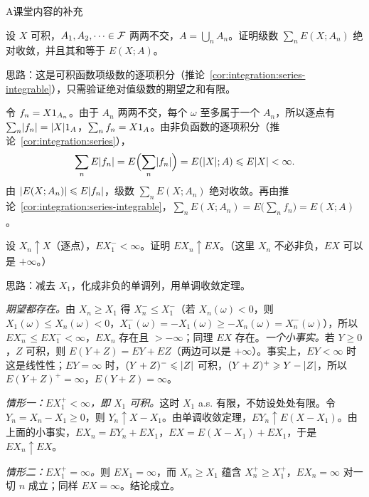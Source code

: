 \begin{exercises}{A}{课堂内容的补充}
\item\label{ex:expectation:A1} 设 $X$ 可积，$A_1,A_2,\dots\in\mathcal{F}$ 两两不交，$A=\bigcup_nA_n$。证明级数 $\sum_nE(X;A_n)$ 绝对收敛，并且其和等于 $E(X;A)$。
\begin{solution}
思路：这是可积函数项级数的逐项积分（推论~\ref{cor:integration:series-integrable}），只需验证绝对值级数的期望之和有限。

令 $f_n=X1_{A_n}$。由于 $A_n$ 两两不交，每个 $\omega$ 至多属于一个 $A_n$，所以逐点有 $\sum_n\lvert f_n\rvert=\lvert X\rvert1_A$，$\sum_nf_n=X1_A$。由非负函数的逐项积分（推论~\ref{cor:integration:series}），
\[
\sum_nE\lvert f_n\rvert=E\Bigl(\sum_n\lvert f_n\rvert\Bigr)=E(\lvert X\rvert;A)\leqslant E\lvert X\rvert<\infty .
\]
由 $\lvert E(X;A_n)\rvert\leqslant E\lvert f_n\rvert$，级数 $\sum_nE(X;A_n)$ 绝对收敛。再由推论~\ref{cor:integration:series-integrable}，$\sum_nE(X;A_n)=E\bigl(\sum_nf_n\bigr)=E(X;A)$。
\end{solution}

\item\label{ex:expectation:A2} 设 $X_n\uparrow X$（逐点），$EX_1^-<\infty$。证明 $EX_n\uparrow EX$。（这里 $X_n$ 不必非负，$EX$ 可以是 $+\infty$。）
\begin{solution}
思路：减去 $X_1$，化成非负的单调列，用单调收敛定理。

\emph{期望都存在。}由 $X_n\geqslant X_1$ 得 $X_n^-\leqslant X_1^-$（若 $X_n(\omega)<0$，则 $X_1(\omega)\leqslant X_n(\omega)<0$，$X_1^-(\omega)=-X_1(\omega)\geqslant-X_n(\omega)=X_n^-(\omega)$），所以 $EX_n^-\leqslant EX_1^-<\infty$，$EX_n$ 存在且 $>-\infty$；同理 $EX$ 存在。\emph{一个小事实。}若 $Y\geqslant0$，$Z$ 可积，则 $E(Y+Z)=EY+EZ$（两边可以是 $+\infty$）。事实上，$EY<\infty$ 时这是线性性；$EY=\infty$ 时，$(Y+Z)^-\leqslant\lvert Z\rvert$ 可积，$(Y+Z)^+\geqslant Y-\lvert Z\rvert$，所以 $E(Y+Z)^+=\infty$，$E(Y+Z)=\infty$。

\emph{情形一：$EX_1^+<\infty$，即 $X_1$ 可积。}这时 $X_1$ a.s. 有限，不妨设处处有限。令 $Y_n=X_n-X_1\geqslant0$，则 $Y_n\uparrow X-X_1$。由单调收敛定理，$EY_n\uparrow E(X-X_1)$。由上面的小事实，$EX_n=EY_n+EX_1$，$EX=E(X-X_1)+EX_1$，于是 $EX_n\uparrow EX$。

\emph{情形二：$EX_1^+=\infty$。}则 $EX_1=\infty$，而 $X_n\geqslant X_1$ 蕴含 $X_n^+\geqslant X_1^+$，$EX_n=\infty$ 对一切 $n$ 成立；同样 $EX=\infty$。结论成立。
\end{solution}


\end{exercises}
